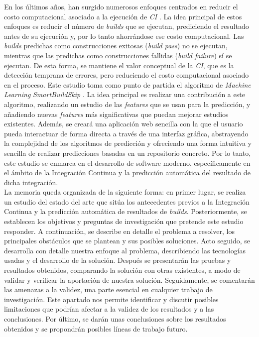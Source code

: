 En los últimos años, han surgido numerosos enfoques centrados en reducir el costo computacional
asociado a la ejecución de \textit{CI} \cite{1,2,4,5,6,7}. La idea principal de estos enfoques es
reducir el número de \textit{builds} que se ejecutan, prediciendo el resultado antes de su
ejecución y, por lo tanto ahorrándose ese costo computacional. Las \textit{builds} predichas como
construcciones exitosas (\textit{build pass}) no se ejecutan, mientras que las predichas como
construcciones fallidas (\textit{build failure}) sí se ejecutan. De esta forma, se mantiene el
valor conceptual de la \textit{CI}, que es la detección temprana de errores, pero reduciendo
el costo computacional asociado en el proceso. Este estudio toma como punto de partida el
algoritmo de \textit{Machine Learning} \textit{SmartBuildSkip} \cite{2}. La idea principal es
realizar una contribución a este algoritmo, realizando un estudio de las \textit{features} que
se usan para la predicción, y añadiendo nuevas \textit{features} más significativas que puedan
mejorar estudios existentes. Además, se creará una aplicación web sencilla con la que el usuario
pueda interactuar de forma directa a través de una interfaz gráfica, abstrayendo la complejidad
de los algoritmos de predicción y ofreciendo una forma intuitiva y sencilla de realizar
predicciones basadas en un repositorio concreto. Por lo tanto, este estudio se enmarca en el
desarrollo de software moderno, específicamente en el ámbito de la Integración Continua y la
predicción automática del resultado de dicha integración.\\

La memoria queda organizada de la siguiente forma: en primer lugar, se realiza un estudio del
estado del arte que sitúa los antecedentes previos a la Integración Continua y la predicción
automática de resultados de \textit{builds}. Posteriormente, se establecen los objetivos y
preguntas de investigación que pretende este estudio responder. A continuación, se describe
en detalle el problema a resolver, los principales obstáculos que se plantean y sus posibles
soluciones. Acto seguido, se desarrolla con detalle nuestra enfoque al problema, describiendo
las tecnologías usadas y el desarrollo de la solución. Después se presentarán las pruebas y
resultados obtenidos, comparando la solución con otras existentes, a modo de validar y verificar
la aportación de nuestra solución. Seguidamente, se comentarán las amenazas a la validez, una
parte esencial en cualquier trabajo de investigación. Este apartado nos permite identificar y
discutir posibles limitaciones que podrían afectar a la validez de los resultados y a las
conclusiones. Por último, se darán unas conclusiones sobre los resultados obtenidos y se
propondrán posibles líneas de trabajo futuro.
